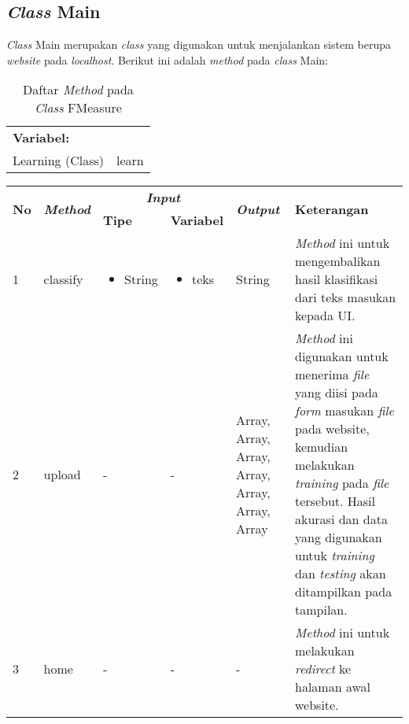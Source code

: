 \subsection{\textit{Class} Main}
\textit{Class }Main merupakan \textit{class }yang digunakan untuk menjalankan sistem berupa \textit{website} pada \textit{localhost}. Berikut ini adalah \textit{method} pada \textit{class }Main:
\begin{table}[H]
	\caption{Daftar \textit{Method} pada \textit{Class} FMeasure}
	\centering
	\small
	\begin{adjustbox}{width=1\textwidth}
	\begin{tabular}{|p{4cm} p{9cm}|}
		\hline
		\multicolumn{2}{|l|}{\textbf{Variabel:}}\\
		Learning (Class)&learn\\
		\hline
	\end{tabular}
	\end{adjustbox}
\end{table}
\begin{table}[H]
	\centering
	\small
	\begin{adjustbox}{width=1\textwidth}
	\begin{tabular}{|p{0.4cm}|p{3.2cm}|p{1.4cm}|p{1.7cm}|p{1.20cm}|p{3.35cm}|}
		\hline
		\multirow{2}{*}{\textbf{No}} & \multirow{2}{*}{\textit{\textbf{Method}}} & \multicolumn{2}{c|}{\textit{\textbf{Input}}} & \multirow{2}{*}{\textit{\textbf{Output}}} & 
		\multirow{2}{*}{\textbf{Keterangan}}\\
		\cline{3-4}
		& & \textbf{Tipe} & \textbf{Variabel} & & \\
		\hline
		1 & classify & \begin{itemize}[leftmargin=*,label={-}]
			\item String\end{itemize}
		& \begin{itemize}[leftmargin=*,label={-}]
			\item teks\end{itemize}
		& String & \textit{Method} ini untuk mengembalikan hasil klasifikasi 
		dari teks masukan\textit{ }kepada UI. \\
		\hline
		2 & upload & - & - & Array, Array, Array, Array, Array, Array, Array & 
		\textit{Method} ini digunakan untuk menerima \textit{file} yang diisi pada \textit{form }masukan \textit{file} pada website, kemudian melakukan \textit{training} pada \textit{file} tersebut. Hasil akurasi dan data yang digunakan untuk \textit{training }dan \textit{testing} akan ditampilkan pada tampilan. \\
		\hline
		3 & home & - & - & - & \textit{Method} ini untuk melakukan \textit{redirect} ke halaman awal website. \\
		\hline
	\end{tabular}
	\end{adjustbox}
\end{table}

